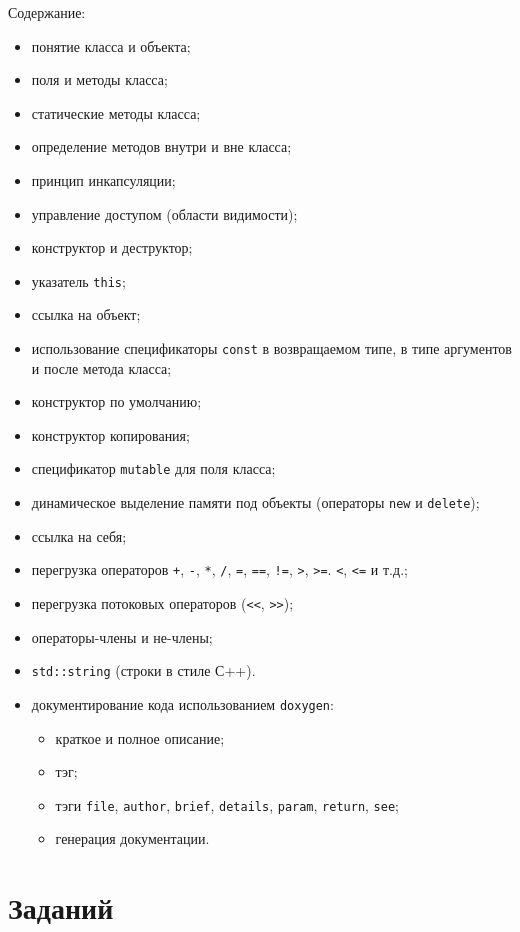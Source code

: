 \documentclass[a4paper,12pt]{article}
\begin{document}
Содержание:
\begin{itemize}
\item понятие класса и объекта;
\item поля и методы класса;
\item статические методы класса;
\item определение методов внутри и вне класса;
\item принцип инкапсуляции;
\item управление доступом (области видимости);
\item конструктор и деструктор;
\item указатель \lstinline|this|;
\item ссылка на объект;
\item использование спецификаторы \lstinline|const| в возвращаемом
  типе, в типе аргументов и после метода класса;
\item конструктор по умолчанию;
\item конструктор копирования;
\item спецификатор \lstinline|mutable| для поля класса;
\item динамическое выделение памяти под объекты (операторы
  \lstinline|new| и \lstinline|delete|);
\item ссылка на себя;
\item перегрузка операторов \lstinline|+|, \lstinline|-|,
  \lstinline|*|, \lstinline|/|, \lstinline|=|, \lstinline|==|,
  \lstinline|!=|, \lstinline|>|, \lstinline|>=|. \lstinline|<|,
  \lstinline|<=| и т.д.;
\item перегрузка потоковых операторов (\lstinline|<<|,
  \lstinline|>>|);
\item операторы-члены и не-члены;
\item \lstinline|std::string| (строки в стиле С++).
\item документирование кода использованием \verb|doxygen|:
  \begin{itemize}
  \item краткое и полное описание;
  \item тэг;
  \item тэги \verb|file|, \verb|author|, \verb|brief|, \verb|details|,
    \verb|param|, \verb|return|, \verb|see|;
  \item генерация документации.
  \end{itemize}
\end{itemize}

\section{Заданий}
\label{sec:Task}
\end{document}
